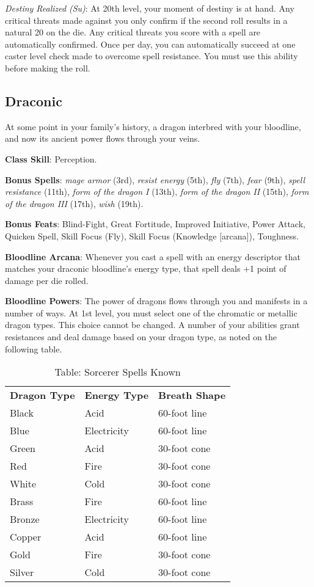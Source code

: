 \textit{Destiny Realized} \textit{(Su)}: At 20th level, your moment of destiny is at hand. Any critical threats made against you only confirm if the second roll results in a natural 20 on the die. Any critical threats you score with a spell are automatically confirmed. Once per day, you can automatically succeed at one caster level check made to overcome spell resistance. You must use this ability before making the roll.
				
\subsection{Draconic}

				
At some point in your family's history, a dragon interbred with your bloodline, and now its ancient power flows through your veins. 
				
\textbf{Class Skill}: Perception.
				
\textbf{Bonus Spells}: \textit{mage armor} (3rd), \textit{resist energy} (5th), \textit{fly} (7th), \textit{fear} (9th), \textit{spell resistance} (11th), \textit{form of the dragon I }(13th), \textit{form of the dragon II} (15th), \textit{form of the dragon III }(17th), \textit{wish} (19th).
				
\textbf{Bonus Feats}: Blind-Fight, Great Fortitude, Improved Initiative, Power Attack, Quicken Spell, Skill Focus (Fly), Skill Focus (Knowledge \mbox{$[$}arcana\mbox{$]$}), Toughness.
				
\textbf{Bloodline Arcana}: Whenever you cast a spell with an energy descriptor that matches your draconic bloodline's energy type, that spell deals +1 point of damage per die rolled.
				
\textbf{Bloodline Powers}: The power of dragons flows through you and manifests in a number of ways. At 1st level, you must select one of the chromatic or metallic dragon types. This choice cannot be changed. A number of your abilities grant resistances and deal damage based on your dragon type, as noted on the following table.


\begin{table}[]
\caption{Table: Sorcerer Spells Known}
\sffamily
\begin{tabular}{lll}
\textbf{Dragon Type} & \textbf{Energy Type} & \textbf{Breath Shape} \\
Black & Acid & 60-foot line \\
Blue & Electricity & 60-foot line \\
Green & Acid & 30-foot cone \\
Red & Fire & 30-foot cone \\
White & Cold & 30-foot cone \\
Brass & Fire & 60-foot line \\
Bronze & Electricity & 60-foot line\\
Copper & Acid & 60-foot line \\
Gold & Fire & 30-foot cone \\
Silver & Cold & 30-foot cone \\
\end{tabular}
\end{table}

